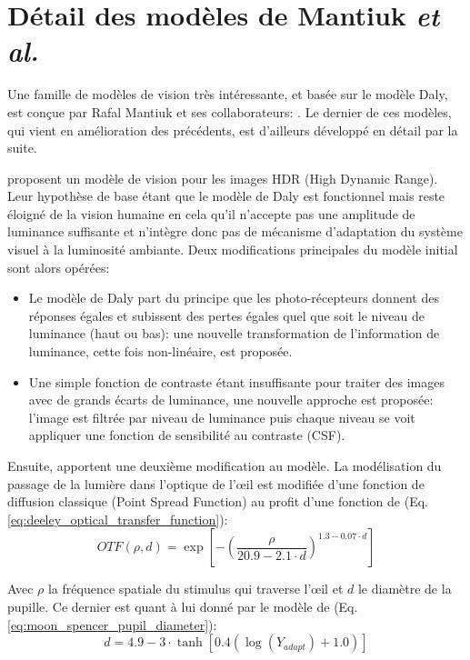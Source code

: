 	\section{Détail des modèles de Mantiuk \textit{et al.}}
	\par Une famille de modèles de vision très intéressante, et basée sur le modèle Daly, est conçue par Rafal Mantiuk et ses collaborateurs: \citep{mantiuk_visible_2004,mantiuk_predicting_2005,mantiuk_human_2015}. Le dernier de ces modèles, qui vient en amélioration des précédents, est d'ailleurs développé en détail par la suite.
	
	\par \citep{mantiuk_visible_2004} proposent un modèle de vision pour les images HDR (High Dynamic Range). Leur hypothèse de base étant que le modèle de Daly est fonctionnel mais reste éloigné de la vision humaine en cela qu'il n'accepte pas une amplitude de luminance suffisante et n'intègre donc pas de mécanisme d'adaptation du système visuel à la luminosité ambiante. Deux modifications principales du modèle initial sont alors opérées:
	\begin{itemize}
	\item Le modèle de Daly part du principe que les photo-récepteurs donnent des réponses égales et subissent des pertes égales quel que soit le niveau de luminance (haut ou bas): une nouvelle transformation de l'information de luminance, cette fois non-linéaire, est proposée.
	\item Une simple fonction de contraste étant insuffisante pour traiter des images avec de grands écarts de luminance, une nouvelle approche est proposée: l'image est filtrée par niveau de luminance puis chaque niveau se voit appliquer une fonction de sensibilité au contraste (CSF).
	\end{itemize}
	
	\par Ensuite, \citep{mantiuk_predicting_2005} apportent une deuxième modification au modèle. La modélisation du passage de la lumière dans l'optique de l'œil est modifiée d'une fonction de diffusion classique (Point Spread Function) au profit d'une fonction de \citep{deeley_simple_1991} (Eq. \ref{eq:deeley_optical_transfer_function}):
	\begin{equation}
	OTF(\rho,d) = \exp \left[ - \left( \frac{\rho}{20.9 - 2.1 \cdot d} \right)^{1.3 - 0.07 \cdot d} \right]
	\label{eq:deeley_optical_transfer_function}
	\end{equation}
	
	\par Avec $\rho$ la fréquence spatiale du stimulus qui traverse l'œil et $d$ le diamètre de la pupille. Ce dernier est quant à lui donné par le modèle de \citep{moon_visual_1944} (Eq. \ref{eq:moon_spencer_pupil_diameter}):
	\begin{equation}
	d = 4.9 - 3 \cdot \tanh \left[ 0.4 \left( \log(Y_{adapt}) + 1.0 \right) \right]
	\label{eq:moon_spencer_pupil_diameter}
	\end{equation}
	
